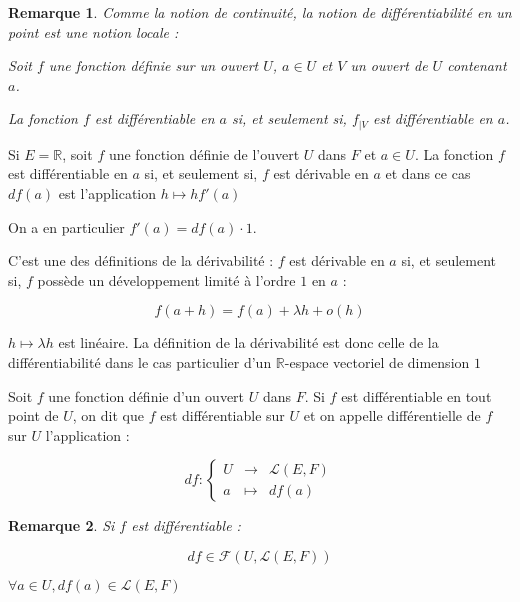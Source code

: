 \documentclass[a4paper,12pt]{book}
\newcommand{\Def}[2]{\begin{tcolorbox}[sharp corners, colback=white,colframe=blue!90!black!75, title=Définition : #1]#2\end{tcolorbox}}
\newcommand{\Prop}[2]{\begin{tcolorbox}[sharp corners, colback=white,colframe=red!90!black!75, title=Proposition : #1]#2\end{tcolorbox}}
\newcommand{\Pre}[1]{\begin{tcolorbox}[sharp corners, colback=white,colframe=green!60!green!30!black!75, title=Preuve]#1\end{tcolorbox}}
\newtheorem{Rem}{Remarque}[section]
\def\R{\mathbb{R}}
\begin{document}
\begin{Rem}
Comme la notion de continuité, la notion de différentiabilité en un point est une notion locale :
\par Soit $f$ une fonction définie sur un ouvert $U$, $a\in U$ et $V$ un ouvert de $U$ contenant $a$.
\par La fonction $f$ est différentiable en $a$ si, et seulement si, $f_{|V}$ est différentiable en $a$.
\end{Rem}
\Prop{}{Si $E=\R$, soit $f$ une fonction définie de l'ouvert $U$ dans $F$ et $a\in U$. La fonction $f$ est différentiable en $a$ si, et seulement si, $f$ est dérivable en $a$ et dans ce cas $df(a)$ est l'application $h\mapsto hf'(a)$
\par On a en particulier $f'(a) = df(a)\cdot 1$.}
\Pre{C'est une des définitions de la dérivabilité : $f$ est dérivable en $a$ si, et seulement si, $f$ possède un développement limité à l'ordre $1$ en $a$ :
\par $$f(a+h) = f(a)+\lambda h+o(h)$$
\par $h\mapsto \lambda h$ est linéaire. La définition de la dérivabilité est donc celle de la différentiabilité dans le cas particulier d'un $\R$-espace vectoriel de dimension $1$}
\Def{}{Soit $f$ une fonction définie d'un ouvert $U$ dans $F$. Si $f$ est différentiable en tout point de $U$, on dit que $f$ est différentiable sur $U$ et on appelle différentielle de $f$ sur $U$ l'application :
\par $$df:\left\{\begin{array}{rcl}U & \to & \mathcal{L}(E,F) \\ a & \mapsto & df(a)\end{array}\right.$$}
\begin{Rem}
Si $f$ est différentiable :
\par $$df\in\mathcal{F}(U, \mathcal{L}(E, F))$$
\par $\forall a\in U, df(a)\in\mathcal{L}(E,F)$
\end{Rem}
\end{document}
